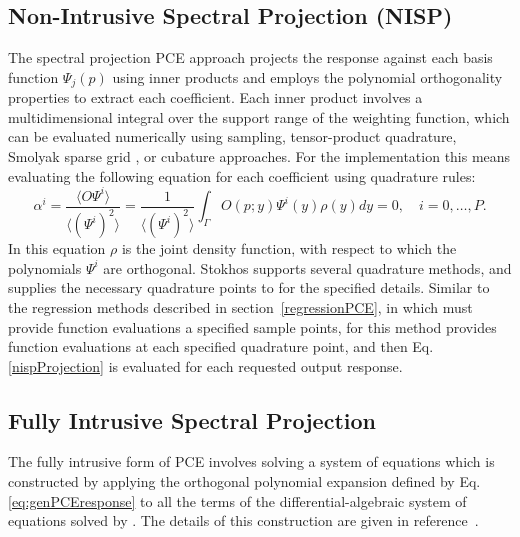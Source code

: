\clearpage
\subsection{Non-Intrusive Spectral Projection (NISP)}
\label{nisp}

The spectral projection PCE approach projects the response
against each basis function $\Psi_j(p)$ using inner
products and employs the polynomial orthogonality properties to
extract each coefficient. Each inner product involves a
multidimensional integral over the support range of the weighting
function, which can be evaluated numerically using sampling,
tensor-product quadrature, Smolyak sparse grid \cite{Smolyak_63}, or
cubature \cite{stroud} approaches.   For the \Xyce{} implementation 
this means evaluating the following equation for each coefficient using 
quadrature rules:
\begin{equation}
\alpha^{i} = \frac{\langle O\varPsi ^{i}\rangle} {\langle (\varPsi ^{i})^{2}\rangle} = \frac{1} {\langle (\varPsi^{i})^{2}\rangle}\int _{\varGamma}O(p ;y)\varPsi ^{i}(y)\rho (y)dy = 0,\quad i = 0,\ldots,P.
  \label{nispProjection}
\end{equation}
In this equation $\rho$ is the joint density function, with respect to which the polynomials $\varPsi^i$ are orthogonal.
Stokhos supports several quadrature methods, and supplies the necessary quadrature points 
to \Xyce{} for the specified details.  Similar to the regression methods 
described in section~\ref{regressionPCE}, in which \Xyce{} must provide function 
evaluations a specified sample points, for this method \Xyce{} provides 
function evaluations at each specified quadrature point, and then Eq. \eqref{nispProjection}
is evaluated for each requested output response.


\subsection{Fully Intrusive Spectral Projection}
\label{intrusivePCE}
The fully intrusive form of PCE involves solving a system of equations which is constructed by 
applying the orthogonal polynomial expansion defined by 
Eq. \eqref{eq:genPCEresponse} to all the terms of the differential-algebraic 
system of equations solved by \Xyce{}.  The details of this construction are given in 
reference~\cite{xyceAdvancedUQ}.

\clearpage

